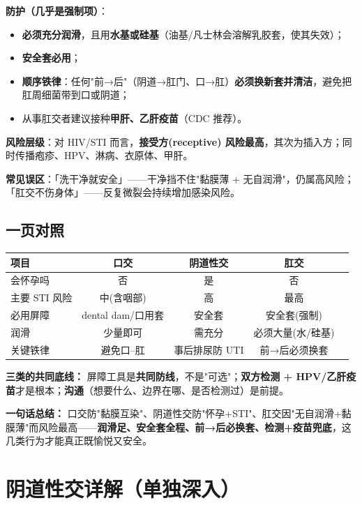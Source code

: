 \documentclass[12pt,UTF8,openany]{ctexbook}
\begin{document}
\textbf{防护（几乎是强制项）}：
\begin{itemize}[leftmargin=2em,itemsep=0.3em]
  \item \textbf{必须充分润滑}，且用\textbf{水基或硅基}（油基/凡士林会溶解乳胶套，使其失效）；
  \item \textbf{安全套必用}；
  \item \textbf{顺序铁律}：任何"前→后"（阴道→肛门、口→肛）\textbf{必须换新套并清洁}，避免把肛周细菌带到口或阴道；
  \item 从事肛交者建议接种\textbf{甲肝、乙肝疫苗}（CDC 推荐）。
\end{itemize}

\textbf{风险层级}：对 HIV/STI 而言，\textbf{接受方(receptive) 风险最高}，其次为插入方；同时传播疱疹、HPV、淋病、衣原体、甲肝。

\textbf{常见误区}：「洗干净就安全」——干净挡不住"黏膜薄 + 无自润滑"，仍属高风险；「肛交不伤身体」——反复微裂会持续增加感染风险。

\section{一页对照}

\begin{tabularx}{\textwidth}{lCCCC}
\toprule
项目 & 口交 & 阴道性交 & 肛交 \\
\midrule
会怀孕吗 & 否 & 是 & 否 \\
主要 STI 风险 & 中(含咽部) & 高 & 最高 \\
必用屏障 & dental dam/口用套 & 安全套 & 安全套(强制) \\
润滑 & 少量即可 & 需充分 & 必须大量(水/硅基) \\
关键铁律 & 避免口--肛 & 事后排尿防 UTI & 前→后必须换套 \\
\bottomrule
\end{tabularx}

\vspace{1em}
\noindent\textbf{三类的共同底线：} 屏障工具是\textbf{共同防线}，不是"可选"；\textbf{双方检测 + HPV/乙肝疫苗}才是根本；\textbf{沟通}（想要什么、边界在哪、是否检测过）是前提。

\noindent\textbf{一句话总结：} 口交防"黏膜互染"、阴道性交防"怀孕+STI"、肛交因"无自润滑+黏膜薄"而风险最高——\textbf{润滑足、安全套全程、前→后必换套、检测+疫苗兜底}，这几类行为才能真正既愉悦又安全。

\chapter{阴道性交详解（单独深入）}
\label{chap:vaginal}
\end{document}
